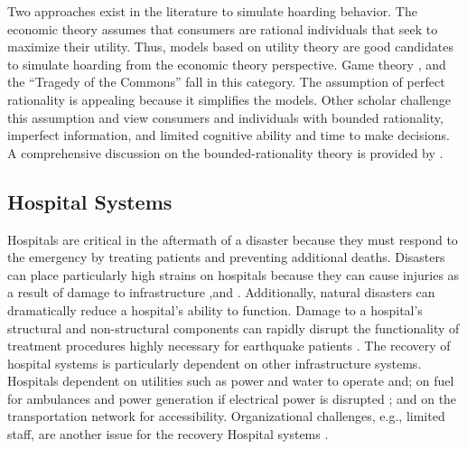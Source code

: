 Two approaches exist in the literature to simulate hoarding behavior. The economic theory assumes that consumers are rational individuals that seek to maximize their utility. Thus, models based on utility theory are good candidates to simulate hoarding from the economic theory perspective. Game theory \citep{hallsworth2000urban}, and the ``Tragedy of the Commons'' \citep{hardin2009tragedy} fall in this category. The assumption of perfect rationality is appealing because it simplifies the models. Other scholar challenge this assumption and view consumers and individuals with bounded rationality, imperfect information, and limited cognitive ability and time to make decisions. A comprehensive discussion on the bounded-rationality theory is provided by \citet{sep-bounded-rationality}. \

\subsection{Hospital Systems}
Hospitals are critical in the aftermath of a disaster because they must respond to the emergency by treating patients and preventing additional deaths. Disasters can place particularly high strains on hospitals because they can cause injuries as a result of damage to infrastructure \citep{jun2010analysis,  ceferino2018regional,ceferino2018probabilistic},and \citep{johnston20142010,}. Additionally, natural disasters can dramatically reduce a hospital's ability to function. Damage to a hospital's structural and non-structural components can rapidly disrupt the functionality of treatment procedures highly necessary for earthquake patients \citep{bambaren2011a3,mitrani2012functional}. The recovery of hospital systems is particularly dependent on other infrastructure systems. Hospitals dependent on utilities such as power and water to operate \citep{McDaniels2008, Hiete2011, Achour2014, jacques2014resilience} and\citep{McDaniels2008}; on fuel for ambulances and power generation if electrical power is disrupted \citep{Hiete2011}; and on the transportation network for accessibility. Organizational challenges, e.g., limited staff, are another issue for the recovery Hospital systems \citep{Cimellaro2016}. \

